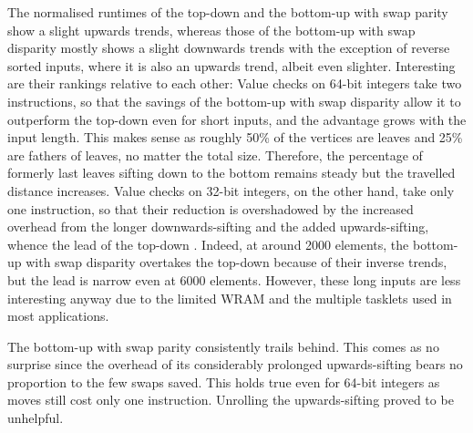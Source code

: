 The normalised runtimes of the top-down \HS{} and the bottom-up \HS{} with swap parity show a slight upwards trends, whereas those of the bottom-up \HS{} with swap disparity mostly shows a slight downwards trends with the exception of reverse sorted inputs, where it is also an upwards trend, albeit even slighter.
Interesting are their rankings relative to each other:
Value checks on 64-bit integers take two instructions, so that the savings of the bottom-up \HS{} with swap disparity allow it to outperform the top-down \HS{} even for short inputs, and the advantage grows with the input length.
This makes sense as roughly 50\% of the vertices are leaves and 25\% are fathers of leaves, no matter the total size.
Therefore, the percentage of formerly last leaves sifting down to the bottom remains steady but the travelled distance increases.
Value checks on 32-bit integers, on the other hand, take only one instruction, so that their reduction is overshadowed by the increased overhead from the longer downwards-sifting and the added upwards-sifting, whence the lead of the top-down \HS{}.
Indeed, at around 2000 elements, the bottom-up \HS{} with swap disparity overtakes the top-down \HS{} because of their inverse trends, but the lead is narrow even at 6000 elements.
However, these long inputs are less interesting anyway due to the limited WRAM and the multiple tasklets used in most applications.

The bottom-up \HS{} with swap parity consistently trails behind.
This comes as no surprise since the overhead of its considerably prolonged upwards-sifting bears no proportion to the few swaps saved.
This holds true even for 64-bit integers as moves still cost only one instruction.
Unrolling the upwards-sifting proved to be unhelpful.
